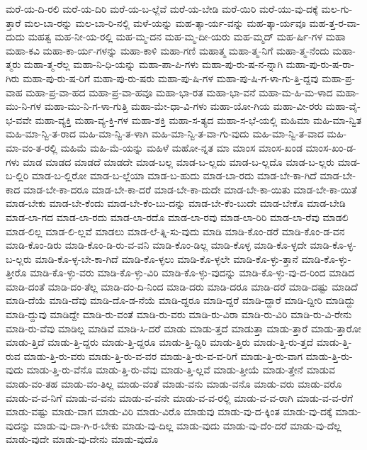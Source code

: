 {ಮರೆ-ಯ-ದಿ-ರಲಿ
ಮರೆ-ಯ-ದಿರಿ
ಮರೆ-ಯ-ಬ-ಲ್ಲೆವೆ
ಮರೆ-ಯ-ಬೇಡಿ
ಮರೆ-ಯಿರಿ
ಮರೆ-ಯು-ವು-ದಕ್ಕೆ
ಮಲ-ಗು-ತ್ತಾರೆ
ಮಲ-ಬಾ-ರನ್ನು
ಮಲ-ಬಾ-ರಿ-ನಲ್ಲಿ
ಮಳೆ-ಯನ್ನು
ಮಹ-ತ್ಕಾ-ರ್ಯ-ವನ್ನು
ಮಹ-ತ್ಕಾ-ರ್ಯವೂ
ಮಹ-ತ್ತ-ರ-ವಾ-ದುದು
ಮಹತ್ವ
ಮಹ-ನೀ-ಯ-ರಲ್ಲಿ
ಮಹ-ಮ್ಮ-ದನ
ಮಹ-ಮ್ಮ-ದೀ-ಯರು
ಮಹ-ಮ್ಮದ್
ಮಹ-ರ್ಷಿ-ಗಳ
ಮಹಾ
ಮಹಾ-ಕವಿ
ಮಹಾ-ಕಾ-ರ್ಯ-ಗಳನ್ನು
ಮಹಾ-ಕಾಳಿ
ಮಹಾ-ಗಣಿ
ಮಹಾತ್ಮ
ಮಹಾ-ತ್ಮ-ನಿಗೆ
ಮಹಾ-ತ್ಮ-ನೆಂದು
ಮಹಾ-ತ್ಮರು
ಮಹಾ-ತ್ಮ-ರೆಲ್ಲ
ಮಹಾ-ನಿ-ಧಿ-ಯನ್ನು
ಮಹಾ-ಪಾ-ಪಿ-ಗಳು
ಮಹಾ-ಪು-ರು-ಷ-ನ-ನ್ನಾಗಿ
ಮಹಾ-ಪು-ರು-ಷ-ರಾ-ಗಿರು
ಮಹಾ-ಪು-ರು-ಷ-ರಿಗೆ
ಮಹಾ-ಪು-ರು-ಷರು
ಮಹಾ-ಪು-ಷಿ-ಗಳ
ಮಹಾ-ಪು-ಷಿ-ಗ-ಳಾ-ಗು-ತ್ತಿ-ದ್ದವು
ಮಹಾ-ಪ್ರ-ವಾಹ
ಮಹಾ-ಪ್ರ-ವಾ-ಹದ
ಮಹಾ-ಪ್ರ-ವಾ-ಹವೂ
ಮಹಾ-ಭಾ-ರತ
ಮಹಾ-ಭಾ-ವನೆ
ಮಹಾ-ಮ-ಹಿ-ಮ-ಳಾದ
ಮಹಾ-ಮು-ನಿ-ಗಳ
ಮಹಾ-ಮು-ನಿ-ಗ-ಳಾ-ಗುತ್ತಿ
ಮಹಾ-ಮೇ-ಧಾ-ವಿ-ಗಳು
ಮಹಾ-ಯೋ-ಗಿಯ
ಮಹಾ-ವೀ-ರರು
ಮಹಾ-ವೈ-ಭ-ವವೇ
ಮಹಾ-ವ್ಯಕ್ತಿ
ಮಹಾ-ವ್ಯ-ಕ್ತಿ-ಗಳ
ಮಹಾ-ಶಕ್ತಿ
ಮಹಾ-ಸ-ತ್ಯದ
ಮಹಾ-ಸ-ಭೆ-ಯಲ್ಲಿ
ಮಹಿಮಾ
ಮಹಿ-ಮಾ-ನ್ವಿತ
ಮಹಿ-ಮಾ-ನ್ವಿ-ತ-ರಾದ
ಮಹಿ-ಮಾ-ನ್ವಿ-ತ-ಳಾಗಿ
ಮಹಿ-ಮಾ-ನ್ವಿ-ತ-ವಾ-ಗು-ವುದು
ಮಹಿ-ಮಾ-ನ್ವಿ-ತ-ವಾದ
ಮಹಿ-ಮಾ-ವಂ-ತ-ರಲ್ಲಿ
ಮಹಿಮೆ
ಮಹಿ-ಮೆ-ಯನ್ನು
ಮಹಿಳೆ
ಮಹೋ-ನ್ನತ
ಮಾ
ಮಾಂಸ
ಮಾಂಸ-ಖಂಡ
ಮಾಂಸ-ಖಂ-ಡ-ಗಳು
ಮಾಡ
ಮಾಡದ
ಮಾಡದೆ
ಮಾಡದೇ
ಮಾಡ-ಬಲ್ಲ
ಮಾಡ-ಬ-ಲ್ಲದು
ಮಾಡ-ಬ-ಲ್ಲದೊ
ಮಾಡ-ಬ-ಲ್ಲರು
ಮಾಡ-ಬ-ಲ್ಲಿರಿ
ಮಾಡ-ಬ-ಲ್ಲಿರೋ
ಮಾಡ-ಬ-ಲ್ಲೆಯಾ
ಮಾಡ-ಬ-ಹುದು
ಮಾಡ-ಬಾ-ರದು
ಮಾಡ-ಬೇ-ಕಾ-ಗಿದೆ
ಮಾಡ-ಬೇ-ಕಾದ
ಮಾಡ-ಬೇ-ಕಾ-ದರೂ
ಮಾಡ-ಬೇ-ಕಾ-ದರೆ
ಮಾಡ-ಬೇ-ಕಾ-ದುದೇ
ಮಾಡ-ಬೇ-ಕಾ-ಯಿತು
ಮಾಡ-ಬೇ-ಕಾ-ಯಿತೆ
ಮಾಡ-ಬೇಕು
ಮಾಡ-ಬೇ-ಕೆಂದು
ಮಾಡ-ಬೇ-ಕೆಂ-ಬು-ದನ್ನು
ಮಾಡ-ಬೇ-ಕೆಂ-ಬುದೇ
ಮಾಡ-ಬೇಕೊ
ಮಾಡ-ಬೇಡಿ
ಮಾಡ-ಲಾ-ಗದ
ಮಾಡ-ಲಾ-ರದು
ಮಾಡ-ಲಾ-ರದೊ
ಮಾಡ-ಲಾ-ರವು
ಮಾಡ-ಲಾ-ರಿರಿ
ಮಾಡ-ಲಾ-ರೆವು
ಮಾಡಲಿ
ಮಾಡ-ಲಿಲ್ಲ
ಮಾಡ-ಲಿ-ಲ್ಲವೆ
ಮಾಡಲು
ಮಾಡ-ಲೆ-ತ್ನಿ-ಸು-ವುದು
ಮಾಡಿ
ಮಾಡಿ-ಕೊಂ-ಡರೆ
ಮಾಡಿ-ಕೊಂ-ಡ-ವನ
ಮಾಡಿ-ಕೊಂ-ಡಿರು
ಮಾಡಿ-ಕೊಂ-ಡಿ-ರು-ವ-ವನಿ
ಮಾಡಿ-ಕೊಂ-ಡಿಲ್ಲ
ಮಾಡಿ-ಕೊಳ್ಳ
ಮಾಡಿ-ಕೊ-ಳ್ಳದೇ
ಮಾಡಿ-ಕೊ-ಳ್ಳ-ಬ-ಲ್ಲರು
ಮಾಡಿ-ಕೊ-ಳ್ಳ-ಬೇ-ಕಾ-ಗಿದೆ
ಮಾಡಿ-ಕೊ-ಳ್ಳಲು
ಮಾಡಿ-ಕೊ-ಳ್ಳಲೇ
ಮಾಡಿ-ಕೊ-ಳ್ಳು-ತ್ತಾನೆ
ಮಾಡಿ-ಕೊ-ಳ್ಳು-ತ್ತೀರೊ
ಮಾಡಿ-ಕೊ-ಳ್ಳು-ವರು
ಮಾಡಿ-ಕೊ-ಳ್ಳು-ವಿರಿ
ಮಾಡಿ-ಕೊ-ಳ್ಳು-ವುದನ್ನು
ಮಾಡಿ-ಕೊ-ಳ್ಳು-ವು-ದ-ರಿಂದ
ಮಾಡಿದ
ಮಾಡಿ-ದಂತೆ
ಮಾಡಿ-ದಂ-ತೆಲ್ಲ
ಮಾಡಿ-ದಂ-ದಿ-ನಿಂದ
ಮಾಡಿ-ದರು
ಮಾಡಿ-ದರೂ
ಮಾಡಿ-ದರೆ
ಮಾಡಿ-ದಷ್ಟು
ಮಾಡಿದೆ
ಮಾಡಿ-ದೆಯೆ
ಮಾಡಿ-ದೆವು
ಮಾಡಿ-ದೊ-ಡ-ನೆಯೆ
ಮಾಡಿ-ದ್ದರೂ
ಮಾಡಿ-ದ್ದರೆ
ಮಾಡಿ-ದ್ದಾರೆ
ಮಾಡಿ-ದ್ದೀರಿ
ಮಾಡಿದ್ದು
ಮಾಡಿ-ದ್ದುವು
ಮಾಡಿದ್ದೇ
ಮಾಡಿ-ರು-ವಂತೆ
ಮಾಡಿ-ರು-ವರು
ಮಾಡಿ-ರು-ವಿರಾ
ಮಾಡಿ-ರು-ವಿರಿ
ಮಾಡಿ-ರು-ವಿ-ರೇನು
ಮಾಡಿ-ರು-ವೆವು
ಮಾಡಿಲ್ಲ
ಮಾಡಿವೆ
ಮಾಡಿ-ಸಿ-ದರೆ
ಮಾಡು
ಮಾಡು-ತ್ತದೆ
ಮಾಡುತ್ತಾ
ಮಾಡು-ತ್ತಾರೆ
ಮಾಡು-ತ್ತಾರೋ
ಮಾಡು-ತ್ತಿದೆ
ಮಾಡು-ತ್ತಿ-ದ್ದರು
ಮಾಡು-ತ್ತಿ-ದ್ದರೂ
ಮಾಡು-ತ್ತಿ-ದ್ದಿರಿ
ಮಾಡು-ತ್ತಿರು
ಮಾಡು-ತ್ತಿ-ರು-ತ್ತದೆ
ಮಾಡು-ತ್ತಿ-ರುವ
ಮಾಡು-ತ್ತಿ-ರು-ವರು
ಮಾಡು-ತ್ತಿ-ರು-ವ-ವರ
ಮಾಡು-ತ್ತಿ-ರು-ವ-ವ-ರಿಗೆ
ಮಾಡು-ತ್ತಿ-ರು-ವಾಗ
ಮಾಡು-ತ್ತಿ-ರು-ವುದು
ಮಾಡು-ತ್ತಿ-ರು-ವೆನೊ
ಮಾಡು-ತ್ತಿ-ರು-ವೆವು
ಮಾಡು-ತ್ತಿ-ಲ್ಲವೆ
ಮಾಡು-ತ್ತೀಯೆ
ಮಾಡು-ತ್ತೇನೆ
ಮಾಡುವ
ಮಾಡು-ವಂ-ತಹ
ಮಾಡು-ವಂ-ತಿಲ್ಲ
ಮಾಡು-ವಂತೆ
ಮಾಡು-ವನು
ಮಾಡು-ವನೊ
ಮಾಡು-ವರು
ಮಾಡು-ವರೊ
ಮಾಡು-ವ-ವ-ನಿಗೆ
ಮಾಡು-ವ-ವನು
ಮಾಡು-ವ-ವನೇ
ಮಾಡು-ವ-ವ-ರಲ್ಲಿ
ಮಾಡು-ವ-ವ-ರಾಗಿ
ಮಾಡು-ವ-ವ-ರೆಗೆ
ಮಾಡು-ವಷ್ಟು
ಮಾಡು-ವಾಗ
ಮಾಡು-ವಿರಿ
ಮಾಡು-ವಿರೊ
ಮಾಡುವು
ಮಾಡು-ವು-ದ-ಕ್ಕಿಂತ
ಮಾಡು-ವು-ದಕ್ಕೆ
ಮಾಡು-ವುದನ್ನು
ಮಾಡು-ವು-ದಾ-ಗಿ-ರ-ಬೇಕು
ಮಾಡು-ವು-ದಿಲ್ಲ
ಮಾಡು-ವುದು
ಮಾಡು-ವು-ದೆಂ-ದರೆ
ಮಾಡು-ವು-ದೆಲ್ಲ
ಮಾಡು-ವುದೇ
ಮಾಡು-ವು-ದೇನು
ಮಾಡು-ವುದೊ
}
